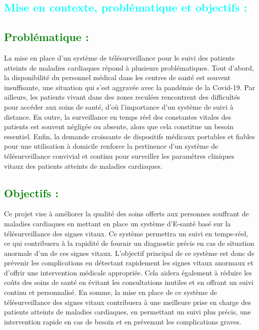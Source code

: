 \begin{flushleft}
	\section{\textcolor{cyan}{Mise en contexte, problématique et objectifs : }}
	
	\subsection{\textcolor{green}{Problématique :}}
	La mise en place d'un système de télésurveillance pour le suivi des patients atteints de maladies cardiaques répond à plusieurs problématiques. Tout d'abord, la disponibilité du personnel médical dans les centres de santé est souvent insuffisante, une situation qui s'est aggravée avec la pandémie de la Covid-19. Par ailleurs, les patients vivant dans des zones reculées rencontrent des difficultés pour accéder aux soins de santé, d'où l'importance d'un système de suivi à distance. En outre, la surveillance en temps réel des constantes vitales des patients est souvent négligée ou absente, alors que cela constitue un besoin essentiel. Enfin, la demande croissante de dispositifs médicaux portables et fiables pour une utilisation à domicile renforce la pertinence d'un système de télésurveillance convivial et continu pour surveiller les paramètres cliniques vitaux des patients atteints de maladies cardiaques.
	
	\subsection{\textcolor{green}{Objectifs :}}
	
	Ce projet vise à améliorer la qualité des soins offerts aux personnes souffrant de maladies cardiaques en mettant en place un système d'E-santé basé sur la télésurveillance des signes vitaux. Ce système permettra un suivi en temps-réel, ce qui contribuera à la rapidité de fournir un diagnostic précis en cas de situation anormale d'un de ces signes vitaux. L'objectif principal de ce système est donc de prévenir les complications en détectant rapidement les signes vitaux anormaux et d'offrir une intervention médicale appropriée. Cela aidera également à réduire les coûts des soins de santé en évitant les consultations inutiles et en offrant un suivi continu et personnalisé. En somme, la mise en place de ce système de télésurveillance des signes vitaux contribuera à une meilleure prise en charge des patients atteints de maladies cardiaques, en permettant un suivi plus précis, une intervention rapide en cas de besoin et en prévenant les complications graves.
\end{flushleft}